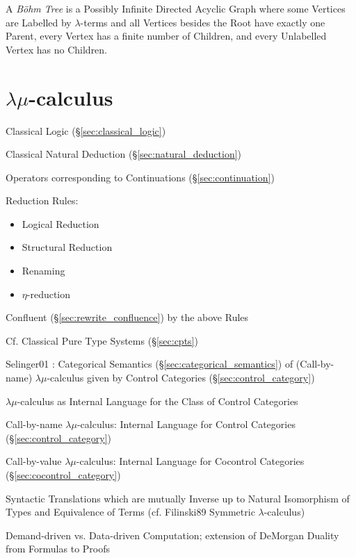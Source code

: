 A \emph{B\"ohm Tree} is a Possibly Infinite Directed Acyclic Graph
where some Vertices are Labelled by $\lambda$-terms and all Vertices
besides the Root have exactly one Parent, every Vertex has a finite
number of Children, and every Unlabelled Vertex has no Children.



\section{$\lambda\mu$-calculus}\label{sec:lambda_mu}

Classical Logic (\S\ref{sec:classical_logic})

Classical Natural Deduction (\S\ref{sec:natural_deduction})

Operators corresponding to Continuations (\S\ref{sec:continuation})

Reduction Rules:
\begin{itemize}
  \item Logical Reduction
  \item Structural Reduction
  \item Renaming
  \item $\eta$-reduction
\end{itemize}

Confluent (\S\ref{sec:rewrite_confluence}) by the above Rules

\fist Cf. Classical Pure Type Systems (\S\ref{sec:cpts})


Selinger01 \cite{selinger01}: Categorical Semantics
(\S\ref{sec:categorical_semantics}) of (Call-by-name)
$\lambda\mu$-calculus given by Control Categories
(\S\ref{sec:control_category})

$\lambda\mu$-calculus as Internal Language for the Class of Control
Categories

Call-by-name $\lambda\mu$-calculus: Internal Language for Control
Categories (\S\ref{sec:control_category})

Call-by-value $\lambda\mu$-calculus: Internal Language for Cocontrol
Categories (\S\ref{sec:cocontrol_category})

Syntactic Translations which are mutually Inverse up to Natural
Isomorphism of Types and Equivalence of Terms (cf. Filinski89
Symmetric $\lambda$-calculus) %

Demand-driven vs. Data-driven Computation; extension of DeMorgan
Duality from Formulas to Proofs %

